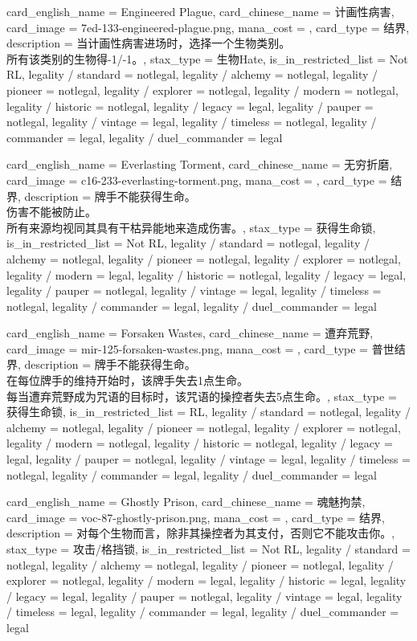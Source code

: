 \documentclass[lang = cn, color = black, 10pt]{AllThatStax}
\begin{document}
\card
{
	card_english_name = {Engineered Plague},
	card_chinese_name = {计画性病害},
	card_image = 7ed-133-engineered-plague.png,
	mana_cost = ,
	card_type = 结界,
	description = {当计画性病害进场时，选择一个生物类别。\\
所有该类别的生物得-1/-1。},
	stax_type = 生物Hate,
	is_in_restricted_list = Not RL,
	legality / standard = notlegal,
	legality / alchemy = notlegal,
	legality / pioneer = notlegal,
	legality / explorer = notlegal,
	legality / modern = notlegal,
	legality / historic = notlegal,
	legality / legacy = legal,
	legality / pauper = notlegal,
	legality / vintage = legal,
	legality / timeless = notlegal,
	legality / commander = legal,
	legality / duel_commander = legal
}

\card
{
	card_english_name = {Everlasting Torment},
	card_chinese_name = {无穷折磨},
	card_image = c16-233-everlasting-torment.png,
	mana_cost = ,
	card_type = 结界,
	description = {牌手不能获得生命。\\
伤害不能被防止。\\
所有来源均视同其具有干枯异能地来造成伤害。},
	stax_type = 获得生命锁,
	is_in_restricted_list = Not RL,
	legality / standard = notlegal,
	legality / alchemy = notlegal,
	legality / pioneer = notlegal,
	legality / explorer = notlegal,
	legality / modern = legal,
	legality / historic = notlegal,
	legality / legacy = legal,
	legality / pauper = notlegal,
	legality / vintage = legal,
	legality / timeless = notlegal,
	legality / commander = legal,
	legality / duel_commander = legal
}

\card
{
	card_english_name = {Forsaken Wastes},
	card_chinese_name = {遭弃荒野},
	card_image = mir-125-forsaken-wastes.png,
	mana_cost = ,
	card_type = 普世结界,
	description = {牌手不能获得生命。\\
在每位牌手的维持开始时，该牌手失去1点生命。\\
每当遭弃荒野成为咒语的目标时，该咒语的操控者失去5点生命。},
	stax_type = 获得生命锁,
	is_in_restricted_list = RL,
	legality / standard = notlegal,
	legality / alchemy = notlegal,
	legality / pioneer = notlegal,
	legality / explorer = notlegal,
	legality / modern = notlegal,
	legality / historic = notlegal,
	legality / legacy = legal,
	legality / pauper = notlegal,
	legality / vintage = legal,
	legality / timeless = notlegal,
	legality / commander = legal,
	legality / duel_commander = legal
}

\card
{
	card_english_name = {Ghostly Prison},
	card_chinese_name = {魂魅拘禁},
	card_image = voc-87-ghostly-prison.png,
	mana_cost = ,
	card_type = 结界,
	description = {对每个生物而言，除非其操控者为其支付，否则它不能攻击你。},
	stax_type = 攻击/格挡锁,
	is_in_restricted_list = Not RL,
	legality / standard = notlegal,
	legality / alchemy = notlegal,
	legality / pioneer = notlegal,
	legality / explorer = notlegal,
	legality / modern = legal,
	legality / historic = legal,
	legality / legacy = legal,
	legality / pauper = notlegal,
	legality / vintage = legal,
	legality / timeless = legal,
	legality / commander = legal,
	legality / duel_commander = legal
}
\end{document}
